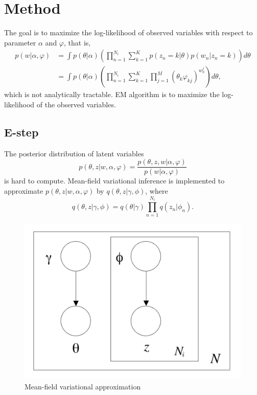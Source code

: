 \documentclass{article}
\begin{document}
\section{Method}

The goal is to maximize the log-likelihood of observed variables with respect to parameter $ \alpha $ and $ \varphi $, that is,
\begin{align*}
	p(w | \alpha, \varphi) &= \int p(\theta | \alpha) (\prod^{N_i}_{n=1} \sum^{K}_{k=1} p(z_n=k | \theta) p(w_n | z_n=k)) d\theta \\
	&= \int p(\theta | \alpha)(\prod^{N_i}_{n=1} \sum^{K}_{k=1} \prod^M_{j=1}(\theta_k \varphi_{kj})^{w_n^{j}}) d\theta,
\end{align*}
which is not analytically tractable. EM algorithm is to maximize the log-likelihood of the observed variables.

\subsection{E-step}
The posterior distribution of latent variables
\begin{equation*}
	p(\theta, z | w, \alpha, \varphi) = \frac{p(\theta, z, w | \alpha, \varphi)}{p(w | \alpha, \varphi)}
\end{equation*}
is hard to compute. Mean-field variational inference is implemented to approximate $ p(\theta, z | w, \alpha, \varphi) $ by $ q(\theta, z | \gamma, \phi) $, where
\begin{equation*}
	q(\theta, z | \gamma, \phi) = q(\theta | \gamma) \prod^{N_i}_{n=1} q(z_n | \phi_n).
\end{equation*}

\begin{figure}[htbp]
	\centering
	\includegraphics[width = 0.4\linewidth]{vi}
	\caption{Mean-field variational approximation}
	\label{lda}
\end{figure}
\end{document}
